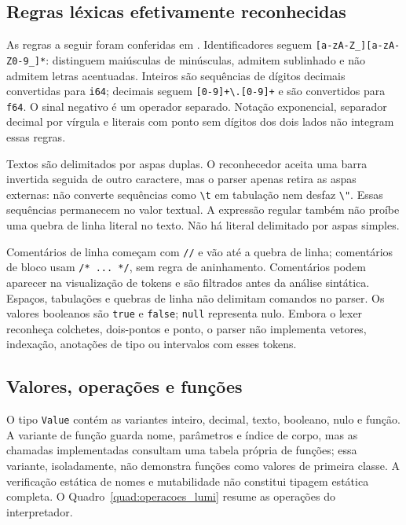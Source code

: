\subsection{Regras léxicas efetivamente reconhecidas}
\label{sec:lexico_lumi_detalhado}

As regras a seguir foram conferidas em .
Identificadores seguem \verb|[a-zA-Z_][a-zA-Z0-9_]*|: distinguem maiúsculas de
minúsculas, admitem sublinhado e não admitem letras acentuadas. Inteiros são
sequências de dígitos decimais convertidas para \texttt{i64}; decimais seguem
\verb|[0-9]+\.[0-9]+| e são convertidos para \texttt{f64}. O sinal negativo é um
operador separado. Notação exponencial, separador decimal por vírgula e literais
com ponto sem dígitos dos dois lados não integram essas regras.

Textos são delimitados por aspas duplas. O reconhecedor aceita uma barra invertida
seguida de outro caractere, mas o parser apenas retira as aspas externas: não
converte sequências como \verb|\t| em tabulação nem desfaz \verb|\"|. Essas
sequências permanecem no valor textual. A expressão regular também não proíbe
uma quebra de linha literal no texto. Não há literal delimitado por aspas simples.

Comentários de linha começam com \verb|//| e vão até a quebra de linha;
comentários de bloco usam \verb|/* ... */|, sem regra de aninhamento. Comentários
podem aparecer na visualização de tokens e são filtrados antes da análise
sintática. Espaços, tabulações e quebras de linha não delimitam comandos no parser.
Os valores booleanos são \texttt{true} e \texttt{false}; \texttt{null} representa
nulo. Embora o lexer reconheça colchetes, dois-pontos e ponto, o parser não
implementa vetores, indexação, anotações de tipo ou intervalos com esses tokens.

\subsection{Valores, operações e funções}
\label{sec:semantica_lumi_detalhada}

O tipo \texttt{Value} contém as variantes inteiro, decimal, texto, booleano,
nulo e função. A variante de função guarda nome, parâmetros e índice de corpo,
mas as chamadas implementadas consultam uma tabela própria de funções; essa
variante, isoladamente, não demonstra funções como valores de primeira classe.
A verificação estática de nomes e mutabilidade não constitui tipagem estática
completa. O Quadro~\ref{quad:operacoes_lumi} resume as operações do interpretador.

